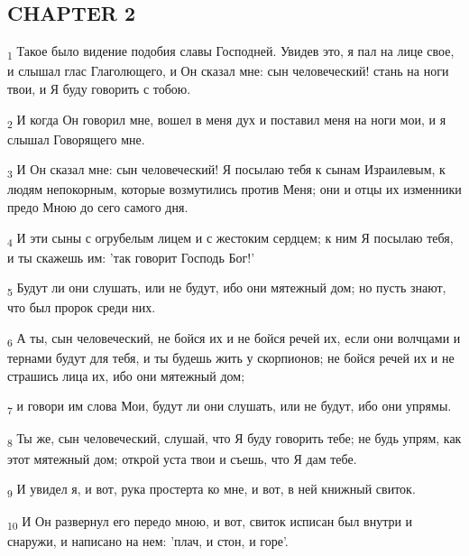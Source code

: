 \subsection{CHAPTER 2}
\begin{tcolorbox}
\textsubscript{1} Такое было видение подобия славы Господней. Увидев это, я пал на лице свое, и слышал глас Глаголющего, и Он сказал мне: сын человеческий! стань на ноги твои, и Я буду говорить с тобою.
\end{tcolorbox}
\begin{tcolorbox}
\textsubscript{2} И когда Он говорил мне, вошел в меня дух и поставил меня на ноги мои, и я слышал Говорящего мне.
\end{tcolorbox}
\begin{tcolorbox}
\textsubscript{3} И Он сказал мне: сын человеческий! Я посылаю тебя к сынам Израилевым, к людям непокорным, которые возмутились против Меня; они и отцы их изменники предо Мною до сего самого дня.
\end{tcolorbox}
\begin{tcolorbox}
\textsubscript{4} И эти сыны с огрубелым лицем и с жестоким сердцем; к ним Я посылаю тебя, и ты скажешь им: 'так говорит Господь Бог!'
\end{tcolorbox}
\begin{tcolorbox}
\textsubscript{5} Будут ли они слушать, или не будут, ибо они мятежный дом; но пусть знают, что был пророк среди них.
\end{tcolorbox}
\begin{tcolorbox}
\textsubscript{6} А ты, сын человеческий, не бойся их и не бойся речей их, если они волчцами и тернами будут для тебя, и ты будешь жить у скорпионов; не бойся речей их и не страшись лица их, ибо они мятежный дом;
\end{tcolorbox}
\begin{tcolorbox}
\textsubscript{7} и говори им слова Мои, будут ли они слушать, или не будут, ибо они упрямы.
\end{tcolorbox}
\begin{tcolorbox}
\textsubscript{8} Ты же, сын человеческий, слушай, что Я буду говорить тебе; не будь упрям, как этот мятежный дом; открой уста твои и съешь, что Я дам тебе.
\end{tcolorbox}
\begin{tcolorbox}
\textsubscript{9} И увидел я, и вот, рука простерта ко мне, и вот, в ней книжный свиток.
\end{tcolorbox}
\begin{tcolorbox}
\textsubscript{10} И Он развернул его передо мною, и вот, свиток исписан был внутри и снаружи, и написано на нем: 'плач, и стон, и горе'.
\end{tcolorbox}
